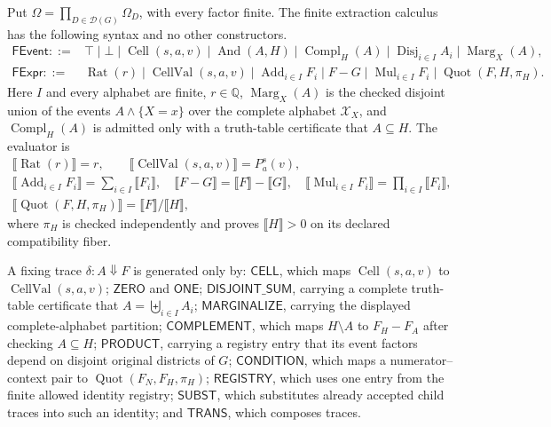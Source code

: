 Put \(\Omega=\prod_{D\in\mathcal D(G)}\Omega_D\), with every factor finite.  The finite extraction calculus has the following syntax and no other constructors.
\[
\begin{split}
\mathsf{FEvent}::={}&\top\mid\bot\mid\operatorname{Cell}(s,a,v)\mid
\operatorname{And}(A,H)\mid\operatorname{Compl}_H(A)\mid
\operatorname{Disj}_{i\in I}A_i\mid
\operatorname{Marg}_{X}(A),\\
\mathsf{FExpr}::={}&\operatorname{Rat}(r)\mid\operatorname{CellVal}(s,a,v)\mid
\operatorname{Add}_{i\in I}F_i\mid F-G\mid
\operatorname{Mul}_{i\in I}F_i\mid
\operatorname{Quot}(F,H,\pi_H).
\end{split}
\]
Here \(I\) and every alphabet are finite, \(r\in\mathbb Q\), \(\operatorname{Marg}_{X}(A)\) is the checked disjoint union of the events \(A\wedge\{X=x\}\) over the complete alphabet \(\mathcal X_X\), and \(\operatorname{Compl}_H(A)\) is admitted only with a truth-table certificate that \(A\subseteq H\).  The evaluator is
\[
\begin{gathered}
\llbracket\operatorname{Rat}(r)\rrbracket=r,\qquad
\llbracket\operatorname{CellVal}(s,a,v)\rrbracket=P_a^s(v),\\
\llbracket\operatorname{Add}_{i\in I}F_i\rrbracket=\sum_{i\in I}\llbracket F_i\rrbracket,\quad
\llbracket F-G\rrbracket=\llbracket F\rrbracket-\llbracket G\rrbracket,\quad
\llbracket\operatorname{Mul}_{i\in I}F_i\rrbracket=\prod_{i\in I}\llbracket F_i\rrbracket,\\
\llbracket\operatorname{Quot}(F,H,\pi_H)\rrbracket
=\llbracket F\rrbracket/\llbracket H\rrbracket,
\end{gathered}
\]
where \(\pi_H\) is checked independently and proves \(\llbracket H\rrbracket>0\) on its declared compatibility fiber.

A fixing trace \(\delta:A\Downarrow F\) is generated only by: \(\mathsf{CELL}\), which maps \(\operatorname{Cell}(s,a,v)\) to \(\operatorname{CellVal}(s,a,v)\); \(\mathsf{ZERO}\) and \(\mathsf{ONE}\); \(\mathsf{DISJOINT\_SUM}\), carrying a complete truth-table certificate that \(A=\biguplus_{i\in I}A_i\); \(\mathsf{MARGINALIZE}\), carrying the displayed complete-alphabet partition; \(\mathsf{COMPLEMENT}\), which maps \(H\setminus A\) to \(F_H-F_A\) after checking \(A\subseteq H\); \(\mathsf{PRODUCT}\), carrying a registry entry that its event factors depend on disjoint original districts of \(G\); \(\mathsf{CONDITION}\), which maps a numerator--context pair to \(\operatorname{Quot}(F_N,F_H,\pi_H)\); \(\mathsf{REGISTRY}\), which uses one entry from the finite allowed identity registry; \(\mathsf{SUBST}\), which substitutes already accepted child traces into such an identity; and \(\mathsf{TRANS}\), which composes traces.

